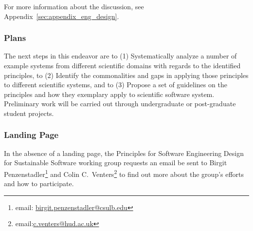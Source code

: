 For more information about the discussion, see Appendix~\ref{sec:appendix_eng_design}.

\subsubsection{Plans}
The next steps in this endeavor are to (1) Systematically analyze a number of example systems from different scientific domains with regards to the identified principles, to (2) Identify the commonalities and gaps in applying those principles to different scientific systems, and to (3) Propose a set of guidelines on the principles and how they exemplary apply to scientific software system. Preliminary work will be carried out through undergraduate or post-graduate student projects.

\subsubsection{Landing Page}
In the absence of a landing page, the Principles for Software Engineering Design for Sustainable Software working group requests an email be sent to Birgit Penzenstadler\footnote{email: \href{mailto:birgit.penzenstadler@csulb.edu}{birgit.penzenstadler@csulb.edu}} and Colin C.\ Venters\footnote{email:\href{mailto:c.venters@hud.ac.uk}{c.venters@hud.ac.uk}} to find out more about the group's efforts and how to participate.
